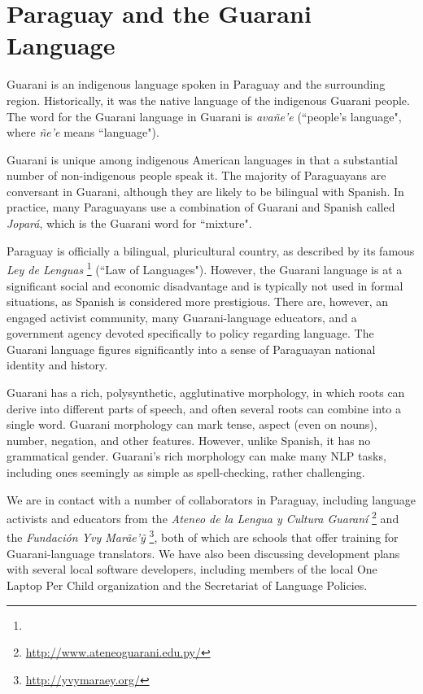 \section{Paraguay and the Guarani Language}
Guarani is an indigenous language spoken in Paraguay and the surrounding
region.
Historically, it was the native language of the indigenous Guarani people. The
word for the Guarani language in Guarani is \emph{avañe'e} (``people's
language", where \emph{ñe'e} means ``language").

Guarani is unique among indigenous American languages in that a substantial
number of non-indigenous people speak it.  The majority of Paraguayans are
conversant in Guarani, although they are likely to be bilingual with Spanish.
In practice, many Paraguayans use a combination of Guarani and Spanish called
\emph{Jopar{\'a}}, which is the Guarani word for ``mixture".

Paraguay is officially a bilingual, pluricultural country, as described by its
famous \emph{Ley de Lenguas} \footnote{\leydelenguas} (``Law of Languages").
However, the Guarani language is at a significant social and economic
disadvantage and is typically not used in formal situations, as Spanish is
considered more prestigious. There are, however, an engaged activist
community, many Guarani-language educators, and a government agency devoted
specifically to policy regarding language.
The Guarani language figures significantly into a sense of Paraguayan national
identity and history.

Guarani has a rich, polysynthetic, agglutinative morphology, in which roots can
derive into different parts of speech, and often several roots can combine into
a single word. Guarani morphology can mark tense, aspect (even on nouns),
number, negation, and other features. However, unlike Spanish, it has no
grammatical gender.  Guarani's rich morphology can make many NLP tasks,
including ones seemingly as simple as spell-checking, rather challenging.

We are in contact with a number of collaborators in Paraguay, including
language activists and educators from the \emph{Ateneo de la Lengua y Cultura
Guaraní} \footnote{\url{http://www.ateneoguarani.edu.py/}} and the
\emph{Fundación Yvy Marãe'{\~y}} \footnote{\url{http://yvymaraey.org/}},
both of which are schools that offer training for Guarani-language translators.
We have also been discussing development plans with several local software
developers, including members of the local One Laptop Per Child organization
and the Secretariat of Language Policies.

